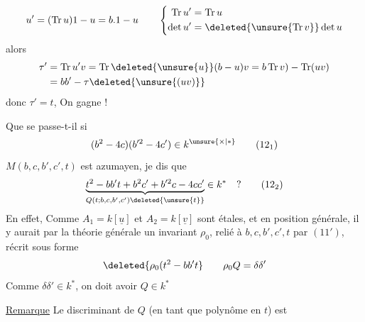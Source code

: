 \[
u'=(\operatorname{Tr}u)1-u=b.1-u
\qquad\left\{\begin{aligned}\operatorname{Tr}u'&=\operatorname{Tr}u\\ \det u'&=\deleted{\unsure{\operatorname{Tr}v}}\det u\end{aligned}\right.
\]
alors
\[\begin{aligned}
\tau'&=\operatorname{Tr}u'v=\operatorname{Tr}\deleted{\unsure{u}}(b-u)v=b\operatorname{Tr}v)-\operatorname{Tr}(uv)\\
&=bb'-\tau\deleted{\unsure{(uv)}}
\end{aligned}\]
donc  $\tau'=t$, On gagne !

Que se passe-t-il si
\[ (b^2-4c)(b'^2-4c')\in k^{\unsure{\times|*}} \tag*{$(12_1)$} \]
  $M(b,c,b',c',t)$ est azumayen, je dis que
\[ \underbrace{t^2-bb't+b^2c'+b'^2c-4cc'}_{Q(t;b,c,b',c')\deleted{\unsure{t}}}\in k^*\quad ? \tag*{$(12_2)$} \]
 En effet, 
Comme $A_1=k[\underline u]$ et $A_2=k[\underline v]$  sont étales, et en position générale, il  y aurait par la théorie générale un invariant $\rho_0$, relié à $b,c,b',c',t$ par $(11')$, récrit sous forme
\[ \deleted{\rho_0(t^2-bb't}\qquad \rho_0Q=\delta\delta' \]
Comme $\delta\delta'\in k^*$, on doit avoir $Q\in k^*$

\uline{Remarque} Le discriminant de $Q$ (en tant que polynôme en $t$) est
